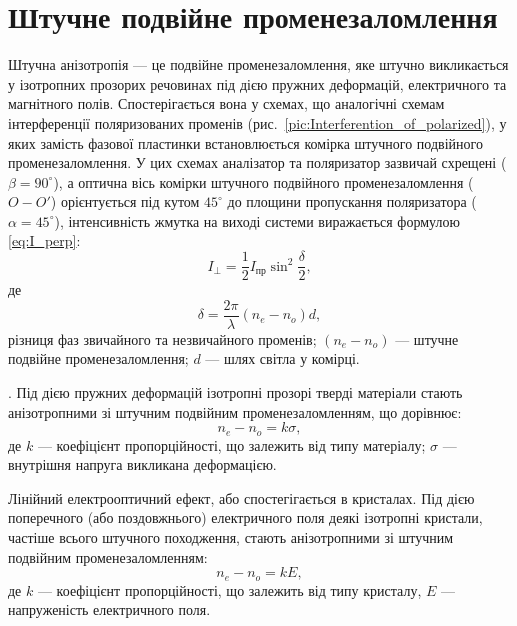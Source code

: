 \section{Штучне подвійне променезаломлення}


Штучна анізотропія --- це подвійне променезаломлення, яке штучно
викликається у ізотропних прозорих речовинах під дією пружних
деформацій, електричного та магнітного полів. Спостерігається вона у
схемах, що аналогічні схемам інтерференції поляризованих променів (рис.~\ref{pic:Interferention_of_polarized}), у яких замість фазової пластинки встановлюється комірка штучного
подвійного променезаломлення. У цих схемах аналізатор та поляризатор зазвичай
схрещені ($ \beta = 90^\circ $), а оптична вісь комірки штучного
подвійного променезаломлення ($ O - O' $) орієнтується під кутом $ 45^\circ $ до площини пропускання поляризатора ($ \alpha = 45^\circ $), інтенсивність жмутка на виході системи виражається
формулою \eqref{eq:I_perp}:
\begin{equation*}
    I_\perp = \frac12 I_\text{пр} \sin^2\frac\delta2,
\end{equation*}
де
\begin{equation*}
    \delta = \frac{2\pi}{\lambda} (n_e - n_o) d,
\end{equation*}
різниця фаз звичайного та незвичайного променів; $ (n_e - n_o) $ --- штучне
подвійне променезаломлення; $ d $ --- шлях світла у комірці.

\medskip

. Під дією пружних деформацій ізотропні
прозорі тверді матеріали стають анізотропними зі штучним
подвійним променезаломленням, що дорівнює:
\begin{equation}\label{eq:photoelasticity}
    n_e - n_o = k\sigma,
\end{equation}
де $ k $ --- коефіцієнт пропорційності, що залежить від типу матеріалу; $ \sigma $ --- внутрішня напруга викликана деформацією.

\medskip

Лінійний електрооптичний ефект, або  спостегігається в кристалах. Під дією поперечного (або поздовжнього)
електричного поля деякі ізотропні кристали, частіше всього штучного
походження, стають анізотропними зі штучним подвійним променезаломленням:
\begin{equation}\label{eq:pollels_effect}
    n_e - n_o = k E,
\end{equation}
де $k$ --- коефіцієнт пропорційності, що залежить від типу кристалу, $ E $ --- напруженість електричного поля.


